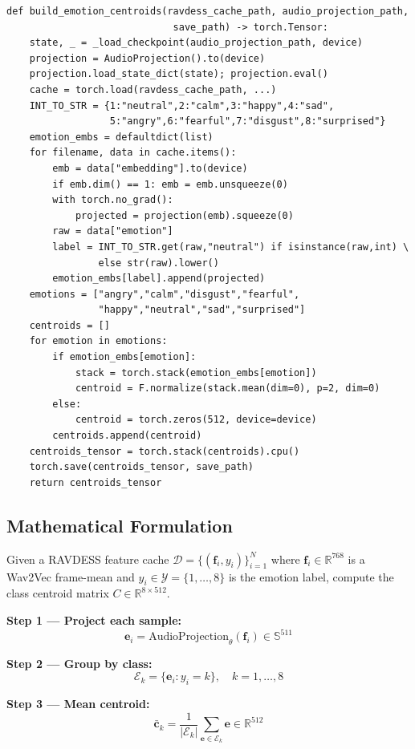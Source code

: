 \documentclass[12pt,a4paper]{article}
\theoremstyle{definition}
\theoremstyle{remark}
\begin{document}
\begin{lstlisting}[caption={\texttt{build\_emotion\_centroids} function}]
def build_emotion_centroids(ravdess_cache_path, audio_projection_path,
                             save_path) -> torch.Tensor:
    state, _ = _load_checkpoint(audio_projection_path, device)
    projection = AudioProjection().to(device)
    projection.load_state_dict(state); projection.eval()
    cache = torch.load(ravdess_cache_path, ...)
    INT_TO_STR = {1:"neutral",2:"calm",3:"happy",4:"sad",
                  5:"angry",6:"fearful",7:"disgust",8:"surprised"}
    emotion_embs = defaultdict(list)
    for filename, data in cache.items():
        emb = data["embedding"].to(device)
        if emb.dim() == 1: emb = emb.unsqueeze(0)
        with torch.no_grad():
            projected = projection(emb).squeeze(0)
        raw = data["emotion"]
        label = INT_TO_STR.get(raw,"neutral") if isinstance(raw,int) \
                else str(raw).lower()
        emotion_embs[label].append(projected)
    emotions = ["angry","calm","disgust","fearful",
                "happy","neutral","sad","surprised"]
    centroids = []
    for emotion in emotions:
        if emotion_embs[emotion]:
            stack = torch.stack(emotion_embs[emotion])
            centroid = F.normalize(stack.mean(dim=0), p=2, dim=0)
        else:
            centroid = torch.zeros(512, device=device)
        centroids.append(centroid)
    centroids_tensor = torch.stack(centroids).cpu()
    torch.save(centroids_tensor, save_path)
    return centroids_tensor
\end{lstlisting}

\subsection{Mathematical Formulation}

Given a RAVDESS feature cache
$\mathcal{D} = \{(\mathbf{f}_i, y_i)\}_{i=1}^{N}$
where $\mathbf{f}_i \in \mathbb{R}^{768}$ is a Wav2Vec frame-mean and
$y_i \in \mathcal{Y} = \{1,\ldots,8\}$ is the emotion label,
compute the class centroid matrix $C \in \mathbb{R}^{8 \times 512}$.

\textbf{Step 1 — Project each sample:}
\[
  \mathbf{e}_i = \text{AudioProjection}_\theta(\mathbf{f}_i)
  \in \mathbb{S}^{511}
\]

\textbf{Step 2 — Group by class:}
\[
  \mathcal{E}_k = \{\mathbf{e}_i : y_i = k\}, \quad k = 1,\ldots,8
\]

\textbf{Step 3 — Mean centroid:}
\[
  \bar{\mathbf{c}}_k = \frac{1}{|\mathcal{E}_k|}\sum_{\mathbf{e} \in \mathcal{E}_k} \mathbf{e}
  \in \mathbb{R}^{512}
\]
\end{document}
